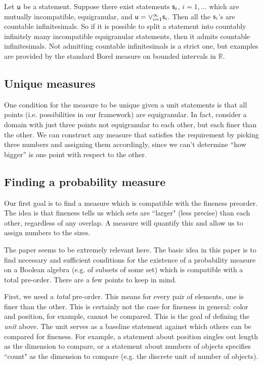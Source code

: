 \documentclass[10pt, onecolumn, nofootinbib]{revtex4-2}
\begin{document}
Let $\stmt[u]$ be a statement. Suppose there exist statements $\stmt_i$, $i=1,\ldots$ which are mutually incompatible, equigranular, and $\stmt[u] = \OR_{i=1}^{\infty}\stmt_i$. Then all the $\stmt_i$'s are countable infinitesimals. So if it is possible to split a statement into countably infinitely many incompatible equigranular statements, then it admits countable infinitesimals. Not admitting countable infinitesimals is a strict one, but examples are provided by the standard Borel measure on bounded intervals in $\mathbb{R}$. 



\subsection{Unique measures}

One condition for the measure to be unique given a unit statements is that all points (i.e. possibilities in our framework) are equigranular. In fact, consider a domain with just three points not equigranular to each other, but each finer than the other. We can construct any measure that satisfies the requirement by picking three numbers and assigning them accordingly, since we can't determine ``how bigger'' is one point with respect to the other.

\subsection{Finding a probability measure}

Our first goal is to find a measure which is compatible with the fineness preorder. The idea is that fineness tells us which sets are ``larger" (less precise) than each other, regardless of any overlap.  A measure will quantify this and allow us to assign numbers to the sizes.

The paper \cite{probexistence} seems to be extremely relevant here. The basic idea in this paper is to find necessary and sufficient conditions for the existence of a probability measure on a Boolean algebra (e.g. of subsets of some set) which is compatible with a total pre-order. There are a few points to keep in mind. 

First, we need a \emph{total} pre-order. This means for every pair of elements, one is finer than the other. This is certainly not the case for fineness in general: color and position, for example, cannot be compared. This is the goal of defining the \emph{unit} above. The unit serves as a baseline statement against which others can be compared for fineness. For example, a statement about position singles out length as the dimension to compare, or a statement about numbers of objects specifies ``count" as the dimension to compare (e.g. the discrete unit of number of objects). 
\end{document}
